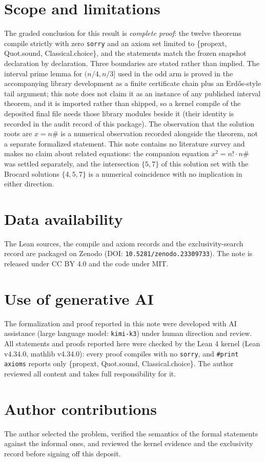\documentclass[11pt]{article}
\begin{document}
\section{Scope and limitations}
The graded conclusion for this result is \emph{complete proof}: the twelve theorems
compile strictly with zero \texttt{sorry} and an axiom set limited to
\{propext, Quot.sound, Classical.choice\}, and the statements match the frozen snapshot
declaration by declaration. Three boundaries are stated rather than implied. The interval
prime lemma for $(n/4, n/3]$ used in the odd arm is proved in the accompanying
library development as a finite
certificate chain plus an Erd\H{o}s-style tail argument; this note does not claim it as an
instance of any published interval theorem, and it is imported rather than shipped, so a
kernel compile of the deposited final file needs those library modules beside it (their
identity is recorded in the audit record of this package). The observation that the solution roots are
$x = n\#$ is a numerical observation recorded alongside the theorem, not a separate
formalized statement. This note contains no literature survey and makes no claim about
related equations: the companion equation $x^2 = n! \cdot n\#$ was settled separately, and
the intersection $\{5,7\}$ of this solution set with the Brocard solutions $\{4,5,7\}$ is a
numerical coincidence with no implication in either direction.

\section*{Data availability}
The Lean sources, the compile and axiom records and the exclusivity-search record are
packaged on Zenodo (DOI: \texttt{10.5281/zenodo.23309733}). The note is released under CC BY 4.0 and
the code under MIT.

\section*{Use of generative AI}
The formalization and proof reported in this note were developed with AI assistance
(large language model: \texttt{kimi-k3}) under human direction and review. All statements
and proofs reported here were checked by the Lean 4 kernel (Lean v4.34.0, mathlib
v4.34.0): every proof compiles with no \texttt{sorry}, and \texttt{\#print axioms} reports
only \{propext, Quot.sound, Classical.choice\}. The author reviewed all content and takes
full responsibility for it.

\section*{Author contributions}
The author selected the problem, verified the semantics of the formal statements against
the informal ones, and reviewed the kernel evidence and the exclusivity record before
signing off this deposit.
\end{document}
